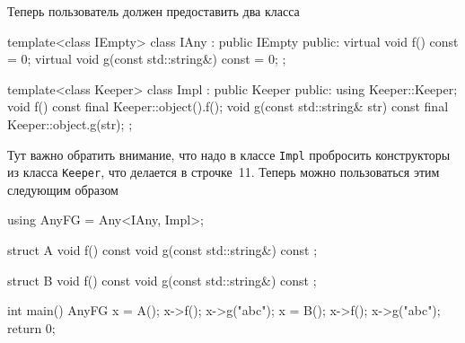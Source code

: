 Теперь пользователь должен предоставить два класса
\begin{cppcode}
template<class IEmpty>
class IAny : public IEmpty {
public:
  virtual void f() const = 0;
  virtual void g(const std::string&) const = 0;
};

template<class Keeper>
class Impl : public Keeper {
public:
  using Keeper::Keeper;
  void f() const final {
    Keeper::object().f();
  }
  void g(const std::string& str) const final {
    Keeper::object.g(str);
  }
};
\end{cppcode}
Тут важно обратить внимание, что надо в классе \verb"Impl" пробросить конструкторы из класса \verb"Keeper", что делается в строчке~11.
Теперь можно пользоваться этим следующим образом
\begin{cppcode}
using AnyFG = Any<IAny, Impl>;

struct A {
  void f() const {}
  void g(const std::string&) const {}
};

struct B {
  void f() const {}
  void g(const std::string&) const {}
};

int main() {
  AnyFG x = A();
  x->f();
  x->g("abc");
  x = B();
  x->f();
  x->g("abc");
  return 0;
}
\end{cppcode}

